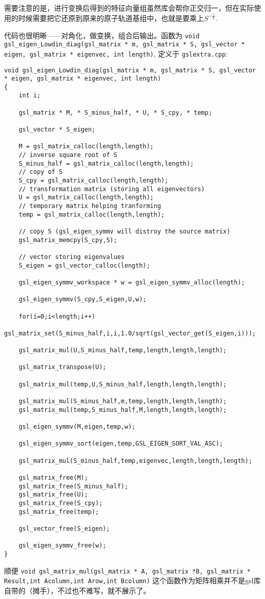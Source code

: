 \documentclass[12pt,a4paper,openany,twoside]{article}
\numberwithin{equation}{section}
\begin{document}
                需要注意的是，进行变换后得到的特征向量组虽然库会帮你正交归一，但在实际使用的时候需要把它还原到原来的原子轨道基组中，也就是要乘上$S^{-\frac{1}{2}}$.

                代码也很明晰——对角化，做变换，组合后输出。函数为 \lstinline$void gsl_eigen_Lowdin_diag(gsl_matrix * m, gsl_matrix * S, gsl_vector * eigen, gsl_matrix * eigenvec, int length)$, 定义于 \lstinline$gslextra.cpp$:

                \begin{lstlisting}
void gsl_eigen_Lowdin_diag(gsl_matrix * m, gsl_matrix * S, gsl_vector * eigen, gsl_matrix * eigenvec, int length)
{
    int i;

    gsl_matrix * M, * S_minus_half, * U, * S_cpy, * temp;

    gsl_vector * S_eigen;

    M = gsl_matrix_calloc(length,length);
    // inverse square root of S
    S_minus_half = gsl_matrix_calloc(length,length);
    // copy of S
    S_cpy = gsl_matrix_calloc(length,length);
    // transformation matrix (storing all eigenvectors)
    U = gsl_matrix_calloc(length,length);
    // temporary matrix helping tranforming
    temp = gsl_matrix_calloc(length,length);

    // copy S (gsl_eigen_symmv will distroy the source matrix)
    gsl_matrix_memcpy(S_cpy,S);

    // vector storing eigenvalues
    S_eigen = gsl_vector_calloc(length);

    gsl_eigen_symmv_workspace * w = gsl_eigen_symmv_alloc(length);

    gsl_eigen_symmv(S_cpy,S_eigen,U,w);

    for(i=0;i<length;i++)
        gsl_matrix_set(S_minus_half,i,i,1.0/sqrt(gsl_vector_get(S_eigen,i)));

    gsl_matrix_mul(U,S_minus_half,temp,length,length,length);

    gsl_matrix_transpose(U);

    gsl_matrix_mul(temp,U,S_minus_half,length,length,length);

    gsl_matrix_mul(S_minus_half,m,temp,length,length,length);
    gsl_matrix_mul(temp,S_minus_half,M,length,length,length);

    gsl_eigen_symmv(M,eigen,temp,w);

    gsl_eigen_symmv_sort(eigen,temp,GSL_EIGEN_SORT_VAL_ASC);

    gsl_matrix_mul(S_minus_half,temp,eigenvec,length,length,length);

    gsl_matrix_free(M);
    gsl_matrix_free(S_minus_half);
    gsl_matrix_free(U);
    gsl_matrix_free(S_cpy);
    gsl_matrix_free(temp);
    
    gsl_vector_free(S_eigen);

    gsl_eigen_symmv_free(w);
}
                \end{lstlisting}
                顺便 \lstinline$void gsl_matrix_mul(gsl_matrix * A, gsl_matrix *B, gsl_matrix * Result,int Acolumn,int Arow,int Bcolumn)$ 这个函数作为矩阵相乘并不是gsl库自带的（摊手），不过也不难写，就不展示了。
\end{document}
